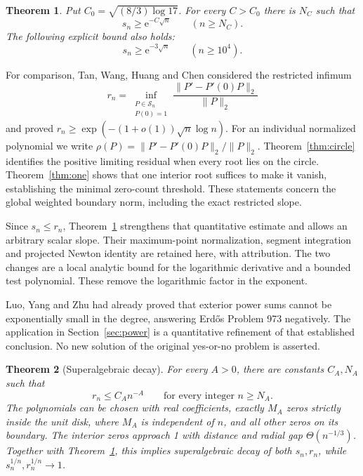 \documentclass[11pt]{article}
\newtheorem{theorem}{Theorem}
\theoremstyle{remark}\newtheorem{remark}[theorem]{Remark}
\newcommand{\norm}[1]{\lVert #1\rVert}
\newcommand{\ee}{\mathrm e}
\begin{document}
\begin{theorem}\label{thm:main}
Put \(C_0=\sqrt{(8/3)\log17}\). For every \(C>C_0\) there is \(N_C\)
such that
\begin{equation}\label{eq:asymptotic}
 s_n\ge \ee^{-C\sqrt n}\qquad(n\ge N_C).
\end{equation}
The following explicit bound also holds:
\begin{equation}\label{eq:explicit}
 s_n\ge \ee^{-3\sqrt n}\qquad(n\ge10^4).
\end{equation}
\end{theorem}

For comparison, Tan, Wang, Huang and Chen \cite[Theorem 1.1]{tan}
considered the restricted infimum
\[
 r_n=\inf_{\substack{P\in\mathcal S_n\\P(0)=1}}
       \frac{\norm{P'-P'(0)P}_2}{\norm P_2}
\]
and proved \(r_n\ge\exp(-(1+o(1))\sqrt n\log n)\).
For an individual normalized polynomial we write
\(\rho(P)=\norm{P'-P'(0)P}_2/\norm P_2\).
Theorem~\ref{thm:circle} identifies the positive limiting residual
when every root lies on the circle. Theorem~\ref{thm:one} shows
that one interior root suffices to make it vanish, establishing the
minimal zero-count threshold. These statements
concern the global weighted boundary norm, including the exact
restricted slope.

Since \(s_n\le r_n\), Theorem~\ref{thm:main} strengthens that quantitative
estimate and allows an arbitrary scalar slope.
Their maximum-point normalization, segment integration and projected
Newton identity are retained here, with attribution. The two changes
are a local analytic bound for the logarithmic derivative and a bounded
test polynomial. These remove the logarithmic factor in the exponent.

Luo, Yang and Zhu \cite[Theorem 1.1]{luo} had already proved that exterior
power sums cannot be exponentially small in the degree, answering
Erd\H{o}s Problem 973 negatively. The application in Section~\ref{sec:power}
is a quantitative refinement of that established conclusion.
No new solution of the original yes-or-no problem is asserted.

\begin{theorem}[Superalgebraic decay]\label{thm:upper}
For every \(A>0\), there are constants \(C_A,N_A\) such that
\[
 r_n\le C_A n^{-A}\qquad\text{for every integer }n\ge N_A.
\]
The polynomials can be chosen with real coefficients, exactly
\(M_A\) zeros strictly inside the unit disk, where \(M_A\) is
independent of \(n\), and all other zeros on its boundary.
The interior zeros approach 1 with distance and radial gap
\(\Theta(n^{-1/3})\). Together with
Theorem~\ref{thm:main}, this implies superalgebraic decay of both
\(s_n,r_n\), while \(s_n^{1/n},r_n^{1/n}\to1\).
\end{theorem}
\end{document}
